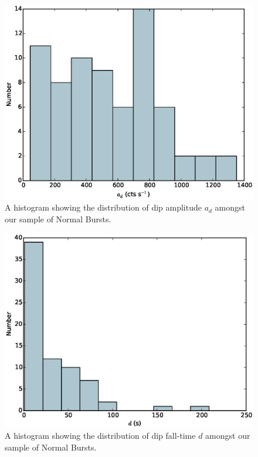 \begin{figure}
  \centering
  \includegraphics[width=.9\linewidth, trim={0cm 0 0cm 0},clip]{images/appendix_dip_pa_hist.eps}
  \caption[Histogram showing the distribution of $a_d$ amongst Normal Bursts.]{A histogram showing the distribution of dip amplitude $a_d$ amongst our sample of Normal Bursts.}
  \label{fig:app_hist_ad}
\end{figure}

\begin{figure}
  \centering
  \includegraphics[width=.9\linewidth, trim={0cm 0 0cm 0},clip]{images/appendix_div_hist.eps}
  \caption[Histogram showing the distribution of $d$ amongst Normal Bursts.]{A histogram showing the distribution of dip fall-time $d$ amongst our sample of Normal Bursts.}
  \label{fig:app_hist_d}
\end{figure}

